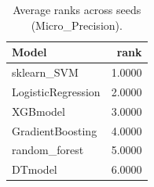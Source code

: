 \begin{table}[t]
\centering
\begin{tabular}{lr}
\toprule
Model & rank \\
\midrule
sklearn_SVM & 1.0000 \\
LogisticRegression & 2.0000 \\
XGBmodel & 3.0000 \\
GradientBoosting & 4.0000 \\
random_forest & 5.0000 \\
DTmodel & 6.0000 \\
\bottomrule
\end{tabular}
\caption{Average ranks across seeds (Micro_Precision).}
\label{tab:avg_rank_Micro_Precision}
\end{table}